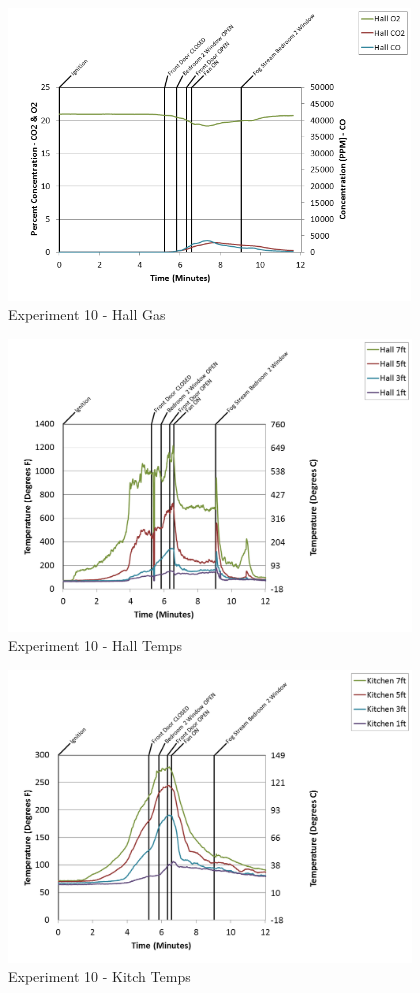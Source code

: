 \documentclass{article}
\begin{document}
\begin{appendices}
\begin{figure}[h!]
	\centering
	\includegraphics[height=3.05in]{0_Images/Results_Charts/Exp_10_Charts/HallGas.png}
	\caption{Experiment 10 - Hall Gas}
\end{figure}

\clearpage

\begin{figure}[h!]
	\centering
	\includegraphics[height=3.05in]{0_Images/Results_Charts/Exp_10_Charts/HallTemps.png}
	\caption{Experiment 10 - Hall Temps}
\end{figure}


\begin{figure}[h!]
	\centering
	\includegraphics[height=3.05in]{0_Images/Results_Charts/Exp_10_Charts/KitchTemps.png}
	\caption{Experiment 10 - Kitch Temps}
\end{figure}


\end{appendices}
\end{document}
